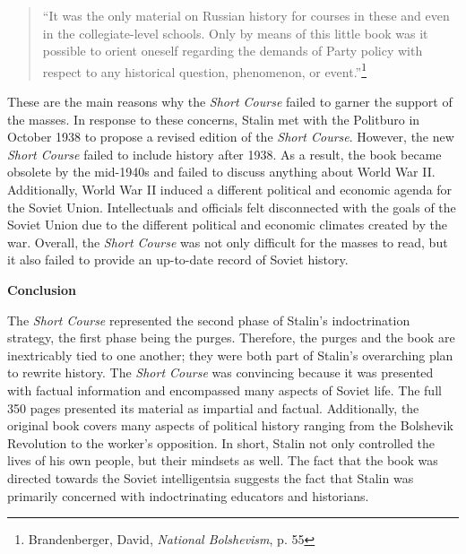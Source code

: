 \documentclass[a4paper, twocolumn]{article}
\begin{document}
\begin{quote}
``It was the only material on Russian history for courses in these and
even in the collegiate-level schools. Only by means of this little
book was it possible to orient oneself regarding the demands of Party
policy with respect to any historical question, phenomenon, or
event.''\footnote{Brandenberger, David, \emph{National Bolshevism}, p. 55}
\end{quote}


These are the main reasons why the \emph{Short Course} failed to garner the
support of the masses. In response to these concerns, Stalin met with
the Politburo in October 1938 to propose a revised edition of the
\emph{Short Course}. However, the new \emph{Short Course} failed to include history after 1938. As a result, the book became obsolete
by the mid-1940s and failed to discuss anything about World War
II. Additionally, World War II induced a different political and
economic agenda for the Soviet Union. Intellectuals and officials felt
disconnected with the goals of the Soviet Union due to the different
political and economic climates created by the war. Overall, the \emph{Short
Course} was not only difficult for the masses to read, but it also
failed to provide an up-to-date record of Soviet history.


\begin{center}\textbf{Conclusion}\end{center}

The \emph{Short Course} represented the second phase of Stalin's
indoctrination strategy, the first phase being the purges. Therefore,
the purges and the book are inextricably tied to one another; they
were both part of Stalin's overarching plan to rewrite history. The \emph{Short Course} was convincing because it was presented with
factual information and encompassed many aspects of Soviet life. The
full 350 pages presented its material as impartial and
factual. Additionally, the original book covers many aspects of
political history ranging from the Bolshevik Revolution to the
worker’s opposition. In short, Stalin not only controlled the lives of
his own people, but their mindsets as well.  The fact that the book
was directed towards the Soviet intelligentsia suggests the fact that
Stalin was primarily concerned with indoctrinating educators and
historians.
\end{document}
